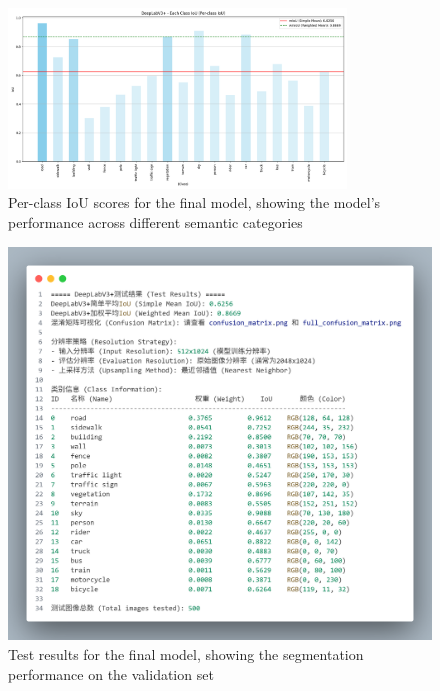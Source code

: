 \documentclass[]{article}
\begin{document}
\begin{figure}[htbp]
    \centering
    \includegraphics[width=0.8\textwidth]{../outputs/deeplabv3plus_test_results/per_class_iou.png}
    \caption{Per-class IoU scores for the final model, showing the model's performance across different semantic categories}
    \label{fig:per_class_iou}
\end{figure}

\begin{figure}[htbp]
		\centering
		\includegraphics[width=1.0\textwidth]{../outputs/deeplabv3plus_test_results/result.png}
		\caption{Test results for the final model, showing the segmentation performance on the validation set}
		\label{fig:result}
\end{figure}
\end{document}
